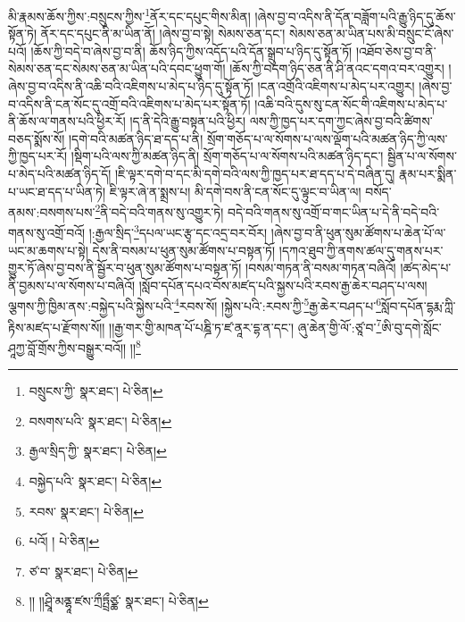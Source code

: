 མི་རྣམས་ཆོས་ཀྱིས་:བསྲུངས་ཀྱིས་\footnote{བསྲུངས་ཀྱི་  སྣར་ཐང་།  པེ་ཅིན། }ནོར་དང་དཔུང་གིས་མིན། །ཞེས་བྱ་བ་འདིས་ནི་དོན་བཟློག་པའི་རྒྱུ་ཉིད་དུ་ཆོས་སྟོན་ཏེ། ནོར་དང་དཔུང་ནི་མ་ཡིན་ནོ། །ཞེས་བྱ་བ་སྟེ། སེམས་ཅན་དང་། སེམས་ཅན་མ་ཡིན་པས་མི་བསྲུང་ངོ་ཞེས་པའོ། །ཆོས་ཀྱི་བདེ་བ་ཞེས་བྱ་བ་ནི། ཆོས་ཉིད་ཀྱིས་འདོད་པའི་དོན་སྒྲུབ་པ་ཉིད་དུ་སྟོན་ཏོ། །འཐོབ་ཅེས་བྱ་བ་ནི་སེམས་ཅན་དང་སེམས་ཅན་མ་ཡིན་པའི་དབང་ཕྱུག་གོ། །ཆོས་ཀྱི་བདག་ཉིད་ཅན་ནི་ཤི་ནའང་དགའ་བར་འགྱུར། །ཞེས་བྱ་བ་འདིས་ནི་འཆི་བའི་འཇིགས་པ་མེད་པ་ཉིད་དུ་སྟོན་ཏོ། །ངན་འགྲོའི་འཇིགས་པ་མེད་པར་འགྱུར། །ཞེས་བྱ་བ་འདིས་ནི་ངན་སོང་དུ་འགྲོ་བའི་འཇིགས་པ་མེད་པར་སྟོན་ཏོ། །འཆི་བའི་དུས་སུ་ངན་སོང་གི་འཇིགས་པ་མེད་པ་ནི་ཆོས་ལ་གནས་པའི་ཕྱིར་རོ། །ད་ནི་དེའི་རྒྱུ་བསྟན་པའི་ཕྱིར། ལས་ཀྱི་ཁྱད་པར་དག་ཀྱང་ཞེས་བྱ་བའི་ཚིགས་བཅད་སྨོས་སོ། །དགེ་བའི་མཚན་ཉིད་ཐ་དད་པ་ནི། སྲོག་གཅོད་པ་ལ་སོགས་པ་ལས་ལྡོག་པའི་མཚན་ཉིད་ཀྱི་ལས་ཀྱི་ཁྱད་པར་རོ། །སྡིག་པའི་ལས་ཀྱི་མཚན་ཉིད་ནི། སྲོག་གཅོད་པ་ལ་སོགས་པའི་མཚན་ཉིད་དང་། སྦྱིན་པ་ལ་སོགས་པ་མེད་པའི་མཚན་ཉིད་དོ། །ཇི་ལྟར་དགེ་བ་དང་མི་དགེ་བའི་ལས་ཀྱི་ཁྱད་པར་ཐ་དད་པ་དེ་བཞིན་དུ། རྣམ་པར་སྨིན་པ་ཡང་ཐ་དད་པ་ཡིན་ཏེ། ཇི་ལྟར་ཞེ་ན་སྨྲས་པ། མི་དགེ་བས་ནི་ངན་སོང་དུ་ལྟུང་བ་ཡིན་ལ། བསོད་ནམས་:བསགས་པས་\footnote{བསགས་པའི་  སྣར་ཐང་།  པེ་ཅིན། }ནི་བདེ་བའི་གནས་སུ་འགྱུར་ཏེ། བདེ་བའི་གནས་སུ་འགྲོ་བ་གང་ཡིན་པ་དེ་ནི་བདེ་བའི་གནས་སུ་འགྲོ་བའོ། །:རྒྱལ་སྲིད་\footnote{རྒྱལ་སྲིད་ཀྱི་  སྣར་ཐང་།  པེ་ཅིན། }དཔལ་ཡང་རྩྭ་དང་འདྲ་བར་བོར། །ཞེས་བྱ་བ་ནི་ཕུན་སུམ་ཚོགས་པ་ཆེན་པོ་ལ་ཡང་མ་ཆགས་པ་སྟེ། དེས་ནི་བསམ་པ་ཕུན་སུམ་ཚོགས་པ་བསྟན་ཏོ། །དཀའ་ཐུབ་ཀྱི་ནགས་ཚལ་དུ་གནས་པར་གྱུར་ཏོ་ཞེས་བྱ་བས་ནི་སྦྱོར་བ་ཕུན་སུམ་ཚོགས་པ་བསྟན་ཏོ། །བསམ་གཏན་ནི་བསམ་གཏན་བཞིའོ། །ཚད་མེད་པ་ནི་བྱམས་པ་ལ་སོགས་པ་བཞིའོ། །སློབ་དཔོན་དཔའ་བོས་མཛད་པའི་སྐྱས་པའི་རབས་རྒྱ་ཆེར་བཤད་པ་ལས། ལྕགས་ཀྱི་ཁྱིམ་ནས་:བསྐྱེད་པའི་སྐྱེས་པའི་\footnote{བསྐྱེད་པའི་  སྣར་ཐང་།  པེ་ཅིན། }རབས་སོ། །སྐྱེས་པའི་:རབས་ཀྱི་\footnote{རབས་  སྣར་ཐང་།  པེ་ཅིན། }རྒྱ་ཆེར་བཤད་པ་\footnote{པའོ། །  པེ་ཅིན། }སློབ་དཔོན་དྷརྨ་ཀླི་རྟིས་མཛད་པ་རྫོགས་སོ།། །།རྒྱ་གར་གྱི་མཁན་པོ་པཎྜི་ཏ་ཛ་ནཱར་དྷ་ན་དང་། ཞུ་ཆེན་གྱི་ལོ་:ཙཱ་བ་\footnote{ཙ་བ་  སྣར་ཐང་།  པེ་ཅིན། }ཨི་བུ་དགེ་སློང་ཤཱཀྱ་བློ་གྲོས་ཀྱིས་བསྒྱུར་བའོ།། །།\footnote{།། །།ཤྲཱི་མནྷཱ་ཛས་ཀྲྀཏྤྲྀཙྪ་  སྣར་ཐང་།  པེ་ཅིན། }